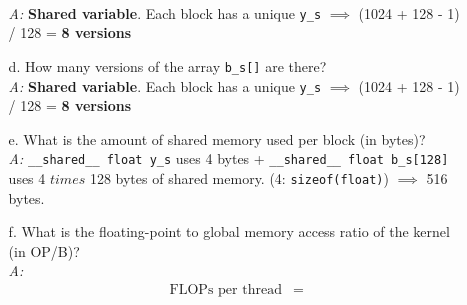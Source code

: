 \begin{enumerate}
\begin{itemize}
                    \\\textsl{A:} \textbf{Shared variable}. Each block has a unique \texttt{y\_s} \(\implies\) (1024 + 128 - 1) / 128 = \textbf{8 versions}
              \item[d.] How many versions of the array \texttt{b\_s[]} are there?
                    \\\textsl{A:} \textbf{Shared variable}. Each block has a unique \texttt{y\_s} \(\implies\) (1024 + 128 - 1) / 128 = \textbf{8 versions}
              \item [e.] What is the amount of shared memory used per block (in bytes)?
                    \\\textsl{A:} \texttt{\_\_shared\_\_ float y\_s} uses 4 bytes + \texttt{\_\_shared\_\_ float b\_s[128]} uses 4 \(times\) 128 bytes of shared memory. (4: \texttt{sizeof(float)}) $\implies$ 516 bytes.
              \item [f.] What is the floating-point to global memory access ratio of the kernel (in OP/B)?
                    \\\textsl{A:}
                    \begin{equation*}
                        \begin{aligned}
                            \text{FLOPs per thread} & =
                        \end{aligned}
                    \end{equation*}
          \end{itemize}
\end{enumerate}